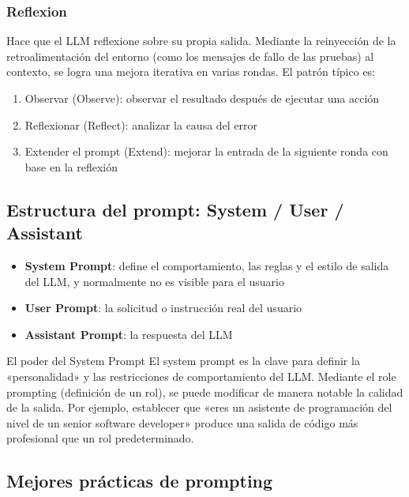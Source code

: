 \subsubsection{Reflexion}

Hace que el LLM reflexione sobre su propia salida. Mediante la reinyección de la retroalimentación del entorno (como los mensajes de fallo de las pruebas) al contexto, se logra una mejora iterativa en varias rondas. El patrón típico es:
\begin{enumerate}
    \item Observar (Observe): observar el resultado después de ejecutar una acción
    \item Reflexionar (Reflect): analizar la causa del error
    \item Extender el prompt (Extend): mejorar la entrada de la siguiente ronda con base en la reflexión
\end{enumerate}

\subsection{Estructura del prompt: System / User / Assistant}

\begin{itemize}
    \item \textbf{System Prompt}: define el comportamiento, las reglas y el estilo de salida del LLM, y normalmente no es visible para el usuario
    \item \textbf{User Prompt}: la solicitud o instrucción real del usuario
    \item \textbf{Assistant Prompt}: la respuesta del LLM
\end{itemize}

\begin{knowledgebox}{El poder del System Prompt}
El system prompt es la clave para definir la «personalidad» y las restricciones de comportamiento del LLM. Mediante el role prompting (definición de un rol), se puede modificar de manera notable la calidad de la salida. Por ejemplo, establecer que «eres un asistente de programación del nivel de un senior software developer» produce una salida de código más profesional que un rol predeterminado.
\end{knowledgebox}

\subsection{Mejores prácticas de prompting}

